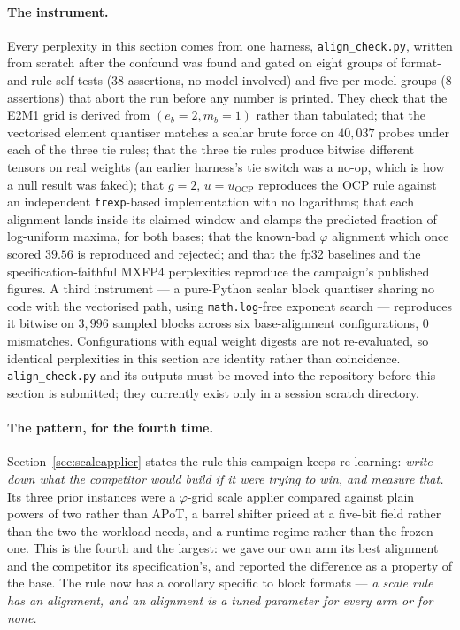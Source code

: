 \documentclass[11pt]{article}
\theoremstyle{definition}
\begin{document}
\paragraph{The instrument.} Every perplexity in this section comes from one
harness, \texttt{align\_check.py}, written from scratch after the confound was
found and gated on eight groups of format-and-rule self-tests ($38$ assertions,
no model involved) and five per-model groups ($8$ assertions) that abort the run
before any number is printed.%
They check that the E2M1 grid is derived from $(e_b{=}2, m_b{=}1)$ rather than
tabulated; that the vectorised element quantiser matches a scalar brute force on
$40{,}037$ probes under each of the three tie rules; that the three tie rules
produce bitwise different tensors on real weights (an earlier harness's tie
switch was a no-op, which is how a null result was faked); that $g=2$,
$u=u_{\mathrm{OCP}}$ reproduces the OCP rule against an independent
\texttt{frexp}-based implementation with no logarithms; that each alignment
lands inside its claimed window and clamps the predicted fraction of
log-uniform maxima, for both bases; that the known-bad $\varphi$ alignment which
once scored $39.56$ is reproduced and rejected; and that the fp32 baselines and
the specification-faithful MXFP4 perplexities reproduce the campaign's published
figures. A third instrument --- a pure-Python scalar block quantiser sharing no
code with the vectorised path, using \texttt{math.log}-free exponent search ---
reproduces it bitwise on $3{,}996$ sampled blocks across six base-alignment
configurations, $0$ mismatches. Configurations with equal weight digests are not
re-evaluated, so identical perplexities in this section are identity rather than
coincidence. \texttt{align\_check.py} and its outputs must be moved into the
repository before this section is submitted; they currently exist only in a
session scratch directory.

\paragraph{The pattern, for the fourth time.} Section~\ref{sec:scaleapplier}
states the rule this campaign keeps re-learning: \emph{write down what the
competitor would build if it were trying to win, and measure that.} Its three
prior instances were a $\varphi$-grid scale applier compared against plain
powers of two rather than APoT, a barrel shifter priced at a five-bit field
rather than the two the workload needs, and a runtime regime rather than the
frozen one. This is the fourth and the largest: we gave our own arm its best
alignment and the competitor its specification's, and reported the difference as
a property of the base. The rule now has a corollary specific to block formats
--- \emph{a scale rule has an alignment, and an alignment is a tuned parameter
for every arm or for none.}
\end{document}
